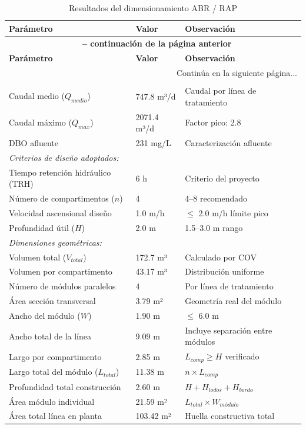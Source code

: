 \documentclass[12pt,a4paper]{article}
\begin{document}
\begin{longtable}{p{6cm}p{3cm}p{5cm}}
\caption{Resultados del dimensionamiento ABR / RAP} \\
\toprule
\textbf{Parámetro} & \textbf{Valor} & \textbf{Observación} \\
\midrule
\endfirsthead
\multicolumn{3}{c}{
    {\bfseries \tablename\ \thetable{} -- continuación de la página anterior}
} \\
\toprule
\textbf{Parámetro} & \textbf{Valor} & \textbf{Observación} \\
\midrule
\endhead
\midrule
\multicolumn{3}{r}{Continúa en la siguiente página...} \\
\endfoot
\bottomrule
\endlastfoot

\multicolumn{3}{l}{\textit{Parámetros de entrada:}} \\
Caudal medio ($Q_{medio}$) & 747.8 m³/d & Caudal por línea de tratamiento \\
Caudal máximo ($Q_{max}$) & 2071.4 m³/d & Factor pico: 2.8 \\
DBO afluente & 231 mg/L & Caracterización afluente \\
\midrule

\multicolumn{3}{l}{\textit{Criterios de diseño adoptados:}} \\
Tiempo retención hidráulico (TRH) & 6 h & Criterio del proyecto \\
Número de compartimentos ($n$) & 4 & 4--8 recomendado \\
Velocidad ascensional diseño & 1.0 m/h & $\leq$ 2.0 m/h límite pico \\
Profundidad útil ($H$) & 2.0 m & 1.5--3.0 m rango \\
\midrule

\multicolumn{3}{l}{\textit{Dimensiones geométricas:}} \\
Volumen total ($V_{total}$) & 172.7 m³ & Calculado por COV \\
Volumen por compartimento & 43.17 m³ & Distribución uniforme \\
Número de módulos paralelos & 4 & Por línea de tratamiento \\
Área sección transversal & 3.79 m² & Geometría real del módulo \\
Ancho del módulo ($W$) & 1.90 m & $\leq$ 6.0 m \\
Ancho total de la línea & 9.09 m & Incluye separación entre módulos \\
Largo por compartimento & 2.85 m & $L_{comp} \geq H$ verificado \\
Largo total del módulo ($L_{total}$) & 11.38 m & $n \times L_{comp}$ \\
Profundidad total construcción & 2.60 m & $H + H_{lodos} + H_{bordo}$ \\
Área módulo individual & 21.59 m² & $L_{total} \times W_{módulo}$ \\
Área total línea en planta & 103.42 m² & Huella constructiva total \\
\midrule


\end{longtable}
\end{document}
